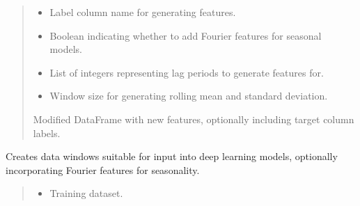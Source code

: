 \documentclass[letterpaper,10pt,english]{sphinxmanual}
\begin{document}
\begin{fulllineitems}
\begin{fulllineitems}
\begin{quote}
\begin{description}
\begin{itemize}
\item {} 
\sphinxAtStartPar
{} \textendash{} Label column name for generating features.

\item {} 
\sphinxAtStartPar
{} \textendash{} Boolean indicating whether to add Fourier features for seasonal models.

\item {} 
\sphinxAtStartPar
{} \textendash{} List of integers representing lag periods to generate features for.

\item {} 
\sphinxAtStartPar
{} \textendash{} Window size for generating rolling mean and standard deviation.

\end{itemize}

\sphinxAtStartPar
Modified DataFrame with new features, optionally including target column labels.

\end{description}\end{quote}

\end{fulllineitems}


\begin{fulllineitems}
\label{\detokenize{docs/data_preprocessing:data_preprocessing.DataPreprocessor.data_windowing}}
\pysigstartsignatures
{}
\pysigstopsignatures
\sphinxAtStartPar
Creates data windows suitable for input into deep learning models, optionally incorporating Fourier features for seasonality.
\begin{quote}\begin{description}
\begin{itemize}
\item {} 
\sphinxAtStartPar
{} \textendash{} Training dataset.


\end{itemize}
\end{description}
\end{quote}
\end{fulllineitems}
\end{fulllineitems}
\end{document}
